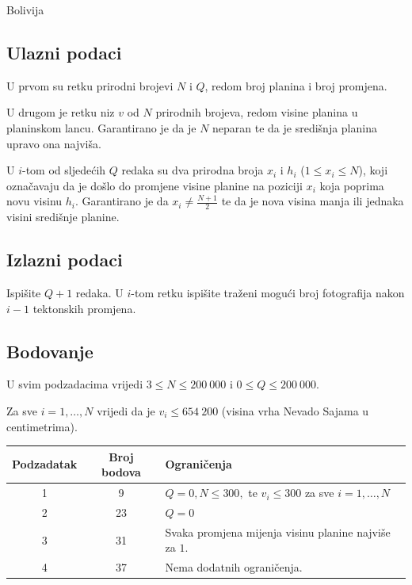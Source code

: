 \begin{statement}[
  problempoints=100,
  timelimit=1 sekunda,
  memorylimit=512 MiB,
]{Bolivija}
\subsection*{Ulazni podaci}

U prvom su retku prirodni brojevi $N$ i $Q$, redom broj planina i broj promjena.

U drugom je retku niz $v$ od $N$ prirodnih brojeva, redom visine planina u planinskom lancu. 
Garantirano je da je $N$ neparan te da je središnja planina upravo ona najviša. 

U $i$-tom od sljedećih $Q$ redaka su dva prirodna broja $x_i$ i $h_i$ ($1 \leq x_i \leq N$), 
koji označavaju da je došlo do promjene visine planine na poziciji $x_i$ koja poprima 
novu visinu $h_i$. Garantirano je da $x_i \ne \frac{N+1}{2}$ te da je nova visina manja 
ili jednaka visini središnje planine. 

\subsection*{Izlazni podaci}

Ispišite $Q + 1$ redaka. U $i$-tom retku ispišite traženi mogući broj fotografija 
nakon $i - 1$ tektonskih promjena. 

\subsection*{Bodovanje}

U svim podzadacima vrijedi $3 \leq N \leq 200~000$ i $0 \leq Q \leq 200~000$. 

Za sve $i = 1, \dots, N$ vrijedi da je $v_i \leq 654~200$ 
(visina vrha Nevado Sajama u centimetrima). 

{\renewcommand{\arraystretch}{1.4}
  \setlength{\tabcolsep}{6pt}
  \begin{tabular}{ccl}
   Podzadatak & Broj bodova & Ograničenja \\ \midrule
    1 & 9 & $Q = 0, N \leq 300,$ te $v_i \leq 300$ za sve $i = 1, \dots, N$ \\
    2 & 23 & $Q = 0$ \\
    3 & 31 & Svaka promjena mijenja visinu planine najviše za $1$.  \\
    4 & 37 & Nema dodatnih ograničenja. \\
\end{tabular}}


\end{statement}

